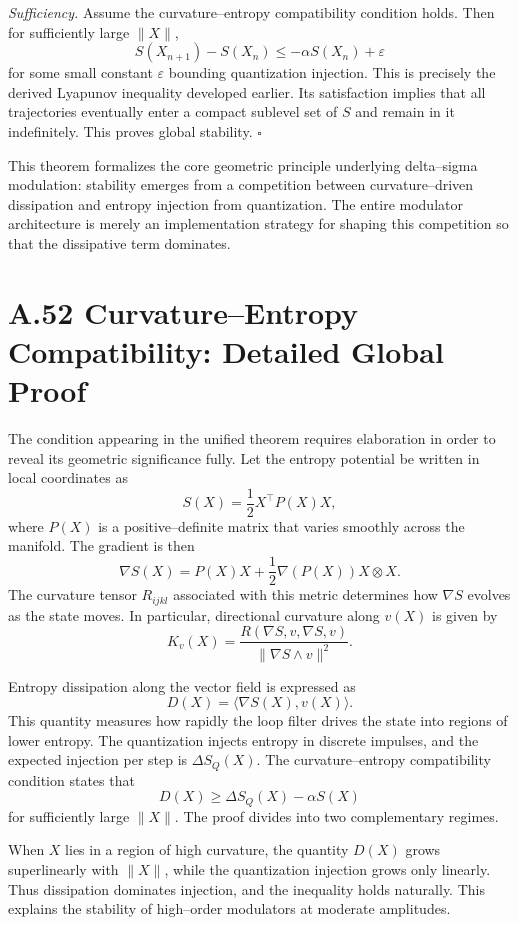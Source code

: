 \emph{Sufficiency.}  
Assume the curvature–entropy compatibility condition holds. Then for sufficiently large \(\|X\|\),
\[
S(X_{n+1}) - S(X_n) \le -\alpha S(X_n) + \varepsilon
\]
for some small constant \(\varepsilon\) bounding quantization injection. This is precisely the derived Lyapunov inequality developed earlier. Its satisfaction implies that all trajectories eventually enter a compact sublevel set of \(S\) and remain in it indefinitely. This proves global stability.  \(\square\)

\medskip

This theorem formalizes the core geometric principle underlying delta–sigma modulation: stability emerges from a competition between curvature–driven dissipation and entropy injection from quantization. The entire modulator architecture is merely an implementation strategy for shaping this competition so that the dissipative term dominates.

\section{A.52 Curvature–Entropy Compatibility: Detailed Global Proof}

The condition appearing in the unified theorem requires elaboration in order to reveal its geometric significance fully. Let the entropy potential be written in local coordinates as
\[
S(X) = \frac{1}{2} X^\top P(X) X,
\]
where \(P(X)\) is a positive–definite matrix that varies smoothly across the manifold. The gradient is then
\[
\nabla S(X) = P(X) X + \frac{1}{2}\nabla(P(X)) X\otimes X.
\]
The curvature tensor \(R_{ijkl}\) associated with this metric determines how \(\nabla S\) evolves as the state moves. In particular, directional curvature along \(v(X)\) is given by
\[
K_v(X) = \frac{R(\nabla S, v, \nabla S, v)}{\|\nabla S \wedge v\|^2}.
\]

Entropy dissipation along the vector field is expressed as 
\[
D(X) = \langle\nabla S(X), v(X)\rangle.
\]
This quantity measures how rapidly the loop filter drives the state into regions of lower entropy. The quantization injects entropy in discrete impulses, and the expected injection per step is \(\Delta S_Q(X)\). The curvature–entropy compatibility condition states that
\[
D(X) \ge \Delta S_Q(X) - \alpha S(X)
\]
for sufficiently large \(\|X\|\). The proof divides into two complementary regimes.

When \(X\) lies in a region of high curvature, the quantity \(D(X)\) grows superlinearly with \(\|X\|\), while the quantization injection grows only linearly. Thus dissipation dominates injection, and the inequality holds naturally. This explains the stability of high–order modulators at moderate amplitudes.

